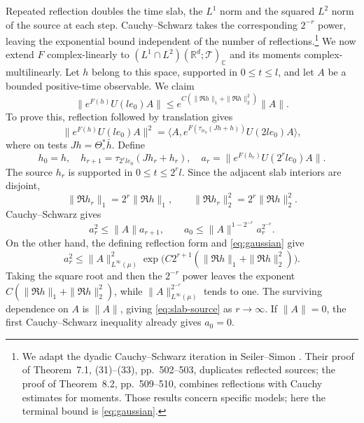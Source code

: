 \documentclass[11pt, letterpaper, reqno]{amsart}
\theoremstyle{definition}
\theoremstyle{remark}
\newcommand{\bbC}{\mathbb{C}}
\newcommand{\bbR}{\mathbb{R}}
\newcommand{\calT}{\mathcal{T}}
\begin{document}
Repeated reflection doubles the time slab, the $L^1$ norm and the
squared $L^2$ norm of the source at each step. Cauchy--Schwarz takes
the corresponding $2^{-r}$ power, leaving the exponential bound
independent of the number of reflections.\footnote{We adapt the dyadic
Cauchy--Schwarz iteration in Seiler--Simon
\cite[Theorem~4.3, (23)--(24), p.~490]{SeilerSimon}. Their proof of
Theorem~7.1, (31)--(33), pp.~502--503, duplicates reflected sources;
the proof of Theorem~8.2, pp.~509--510, combines reflections with
Cauchy estimates for moments. Those results concern specific models;
here the terminal bound is \eqref{eq:gaussian}.}
We now extend $F$ complex-linearly to
$(L^1\cap L^2)(\bbR^d;\calT)_\bbC$ and its moments complex-multilinearly. Let $h$ belong to this space,
supported in $0\leq t\leq l$, and let $A$ be a bounded positive-time
observable. We claim
\begin{equation}\label{eq:slab-source}
 \|e^{F(h)}U(le_0)A\|\leq e^{C(\|\Re h\|_1+\|\Re h\|_2^2)}\|A\|.
\end{equation}
To prove this, reflection followed by translation gives
\begin{equation}
 \|e^{F(h)}U(le_0)A\|^2
 =\big\langle A,e^{F(\tau_{le_0}(Jh+h))}U(2le_0)A\big\rangle,
\end{equation}
where on tests $Jh=\Theta_\circ^*\bar h$. Define
\begin{equation}
 h_0=h,\quad h_{r+1}=\tau_{2^rle_0}(Jh_r+h_r),\quad
 a_r=\|e^{F(h_r)}U(2^rle_0)A\|.
\end{equation}
The source $h_r$ is supported in $0\leq t\leq2^rl$. Since the adjacent
slab interiors are disjoint,
\[
 \|\Re h_r\|_1=2^r\|\Re h\|_1,\qquad
 \|\Re h_r\|_2^2=2^r\|\Re h\|_2^2.
\] Cauchy--Schwarz gives
\begin{equation}
 a_r^2\leq\|A\|a_{r+1},\qquad
 a_0\leq\|A\|^{1-2^{-r}}a_r^{2^{-r}}.
\end{equation}
On the other hand, the defining reflection form and
\eqref{eq:gaussian} give
\begin{equation}
 a_r^2\leq\|A\|_{L^\infty(\mu)}^2
       \exp\bigl(C2^{r+1}(\|\Re h\|_1+\|\Re h\|_2^2)\bigr).
\end{equation}
Taking the square root and then the $2^{-r}$ power leaves the exponent
$C(\|\Re h\|_1+\|\Re h\|_2^2)$, while $\|A\|_{L^\infty(\mu)}^{2^{-r}}$
tends to one. The surviving dependence on $A$ is $\|A\|$, giving
\eqref{eq:slab-source} as $r\to\infty$.
If $\|A\|=0$, the first Cauchy--Schwarz inequality already gives $a_0=0$.
\end{document}
